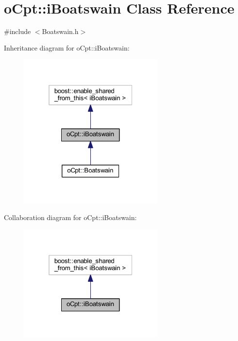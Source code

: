 \hypertarget{classo_cpt_1_1i_boatswain}{}\section{o\+Cpt\+:\+:i\+Boatswain Class Reference}
\label{classo_cpt_1_1i_boatswain}


{\ttfamily \#include $<$Boatswain.\+h$>$}



Inheritance diagram for o\+Cpt\+:\+:i\+Boatswain\+:\nopagebreak
\begin{figure}[H]
\begin{center}
\leavevmode
\includegraphics[width=208pt]{classo_cpt_1_1i_boatswain__inherit__graph}
\end{center}
\end{figure}


Collaboration diagram for o\+Cpt\+:\+:i\+Boatswain\+:\nopagebreak
\begin{figure}[H]
\begin{center}
\leavevmode
\includegraphics[width=208pt]{classo_cpt_1_1i_boatswain__coll__graph}
\end{center}
\end{figure}
